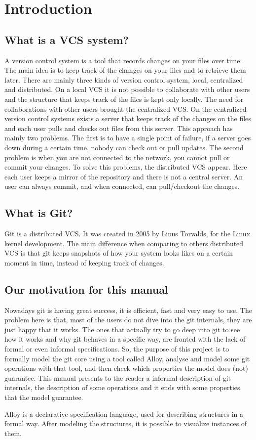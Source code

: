 \section{Introduction}
\subsection{What is a VCS system?}
A version control system is a tool that records changes on your
files over time. The main idea is to keep track of the changes on your
files and to retrieve them later. There are mainly three kinds of 
version control system, local, centralized and distributed. On
a local VCS it is not possible to collaborate with other users and
the structure that keeps track of the files is kept only locally. The
need for collaborations with other users brought the centralized VCS.
On the centralized version control systems exists a server that keeps
track of the changes on the files and each user pulls and checks out files
from this server. This approach has mainly two problems. The
first is to have a single point of failure, if a server goes down
during a certain time, nobody can check out or pull updates. The
second problem is when you are not connected to the network, you
cannot pull or commit your changes. To solve this problems, the
distributed VCS appear. Here each user keeps a mirror of the
repository and there is not a central server. An user can always commit,
and when connected, can pull/checkout the changes.\\
\subsection{What is Git?}
Git is a distributed VCS. It was created in 2005 by Linus Torvalds,
for the Linux kernel development. The main difference when comparing to
others distributed VCS is that git keeps snapshots of how your system
looks likes on a certain moment in time, instead of keeping track of
changes.\\
\subsection{Our motivation for this manual}
Nowadays git is having great success, it is efficient, fast and very
easy to use. The problem here is that, most of the users do not dive
into the git internals, they are just happy that it works. The ones
that actually try to go deep into git to see how it works and why git
behaves in a specific way, are fronted with the lack of formal or even
informal specifications.  So, the purpose of this project is to
formally model the git core using a tool called 
Alloy, analyse and model some git
operations with that tool, and then check which properties the model does (not)
guarantee. This manual presents to the reader a informal description of
git internals, the description of some operations and it ends with
some properties that the model guarantee.\par
Alloy is a declarative specification language, used for describing structures in 
a formal way. After modeling the structures, it is possible to visualize 
instances of them.

